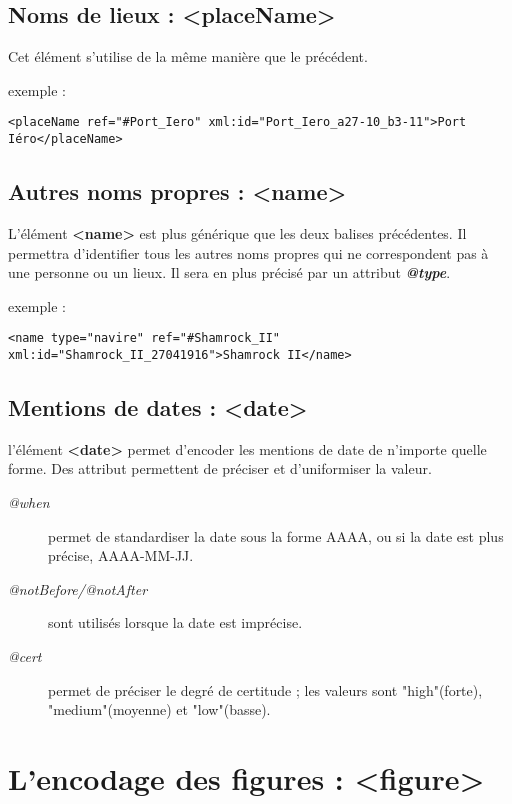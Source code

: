 \documentclass[18pt,a4paper,oneside]{book} %
\begin{document}
\subsection{Noms de lieux : <placeName>}

Cet élément s'utilise de la même manière que le précédent. 
\bigskip 

exemple :
\begin{lstlisting}
<placeName ref="#Port_Iero" xml:id="Port_Iero_a27-10_b3-11">Port 
Iéro</placeName> 
\end{lstlisting}

\subsection{Autres noms propres : <name>}

L'élément \textbf{<name>} est plus générique que les deux balises précédentes. Il permettra d'identifier tous les autres noms propres qui ne correspondent pas à une personne ou un lieux. Il sera en plus précisé par un attribut \textit{\textbf{@type}}.
\bigskip 
 
exemple : 
\begin{lstlisting}
<name type="navire" ref="#Shamrock_II" xml:id="Shamrock_II_27041916">Shamrock II</name> 
\end{lstlisting}

\subsection{Mentions de dates : <date>}

l'élément \textbf{<date>} permet d'encoder les mentions de date de n'importe quelle forme. Des attribut permettent de préciser et d'uniformiser la valeur. 

\begin{description}
\item [\textit{@when}] permet de standardiser la date sous la forme AAAA, ou si la date est plus précise, AAAA-MM-JJ.
\item [\textit{@notBefore/@notAfter}] sont utilisés lorsque la date est imprécise. 
\item [\textit{@cert}] permet de préciser le degré de certitude ; les valeurs sont "high"(forte), "medium"(moyenne) et "low"(basse).
\end{description}

\section{L'encodage des figures : <figure>}
\end{document}
